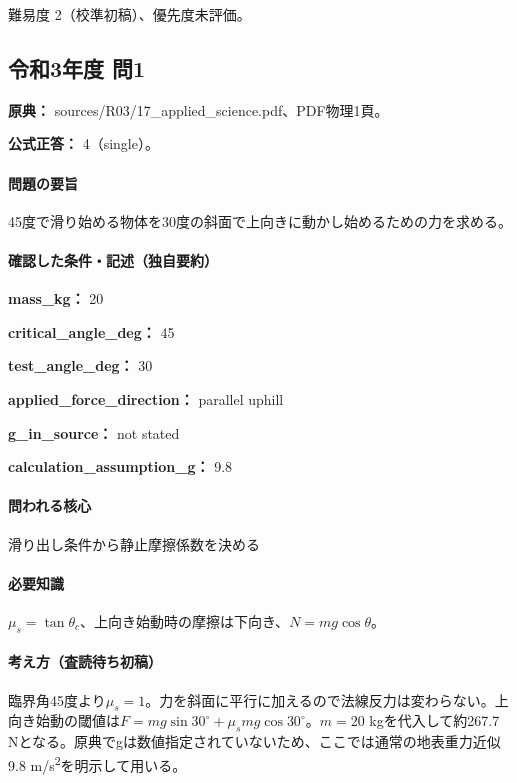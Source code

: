 \par 難易度 2（校準初稿）、優先度未評価。

\subsection{令和3年度 問1}
\label{q:r03-reg-applied-01}

\noindent\textbf{原典：} sources/R03/17\_applied\_science.pdf、PDF物理1頁。

\textbf{公式正答：} 4（single）。

\paragraph{問題の要旨} 45度で滑り始める物体を30度の斜面で上向きに動かし始めるための力を求める。

\paragraph{確認した条件・記述（独自要約）}\mbox{}\par

\noindent\textbf{mass\_kg：} 20\par

\noindent\textbf{critical\_angle\_deg：} 45\par

\noindent\textbf{test\_angle\_deg：} 30\par

\noindent\textbf{applied\_force\_direction：} parallel uphill\par

\noindent\textbf{g\_in\_source：} not stated\par

\noindent\textbf{calculation\_assumption\_g：} 9.8\par

\paragraph{問われる核心} 滑り出し条件から静止摩擦係数を決める

\paragraph{必要知識} \(\mu_s=\tan\theta_c\)、上向き始動時の摩擦は下向き、\(N=mg\cos\theta\)。

\paragraph{考え方（査読待ち初稿）} 臨界角45度より\(\mu_s=1\)。力を斜面に平行に加えるので法線反力は変わらない。上向き始動の閾値は\(F=mg\sin30^\circ+\mu_smg\cos30^\circ\)。\(m=20\) kgを代入して約267.7 Nとなる。原典でgは数値指定されていないため、ここでは通常の地表重力近似9.8 m/s\textsuperscript{2}を明示して用いる。

